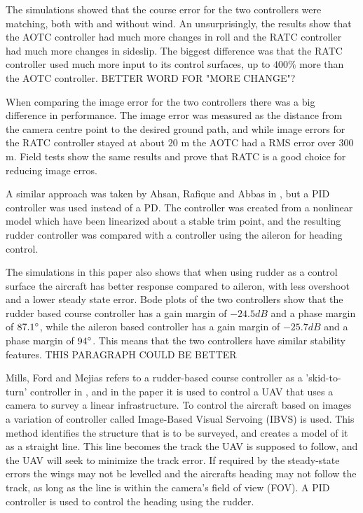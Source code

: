 The simulations showed that the course error for the two controllers were matching, both with and without wind. An unsurprisingly, the results show that the AOTC controller had much more changes in roll and the RATC controller had much more changes in sideslip. The biggest difference was that the RATC controller used much more input to its control surfaces, up to $400 \%$ more than the AOTC controller. BETTER WORD FOR "MORE CHANGE"?

When comparing the image error for the two controllers there was a big difference in performance. The image error was measured as the distance from the camera centre point to the desired ground path, and while image errors for the RATC controller stayed at about $20$ m the AOTC had a RMS error over $300$ m. Field tests show the same results and prove that RATC is a good choice for reducing image erros.


A similar approach was taken by Ahsan, Rafique and Abbas in \cite{alternateSurfaceAhsan}, but a PID controller was used instead of a PD. The controller was created from a nonlinear model which have been linearized about a stable trim point, and the resulting rudder controller was compared with a controller using the aileron for heading control.

The simulations in this paper also shows that when using rudder as a control surface the aircraft has better response compared to aileron, with less overshoot and a lower steady state error. Bode plots of the two controllers show that the rudder based course controller has a gain margin of $-24.5 dB$ and a phase margin of $87.1 \degree$, while the aileron based controller has a gain margin of $-25.7 dB$ and a phase margin of $94 \degree$. This means that the two controllers have similar stability features. THIS PARAGRAPH COULD BE BETTER

Mills, Ford and Mejias refers to a rudder-based course controller as a 'skid-to-turn' controller in \cite{skidToTurnMills}, and in the paper it is used to control a UAV that uses a camera to survey a linear infrastructure. To control the aircraft based on images a variation of controller called Image-Based Visual Servoing (IBVS) is used. This method identifies the structure that is to be surveyed, and creates a model of it as a straight line. This line becomes the track the UAV is supposed to follow, and the UAV will seek to minimize the track error. If required by the steady-state errors the wings may not be levelled and the aircrafts heading may not follow the track, as long as the line is within the camera's field of view (FOV). A PID controller is used to control the heading using the rudder.

